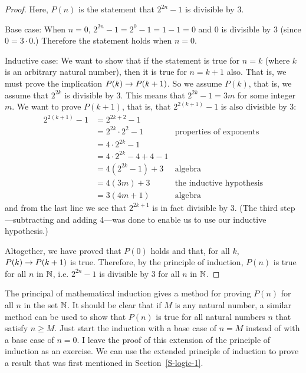 \begin{proof}
Here, $P(n)$ is the statement that $2^{2n}-1$ is divisible by 3.

Base case: When $n=0$, $2^{2n}-1 = 2^0-1=1-1=0$ and $0$ is divisible by 3 
(since $0=3\cdot 0$.)  Therefore the statement holds when $n=0$.

Inductive case: We want to show that if the statement is true for $n=k$ 
(where $k$ is an arbitrary natural number),
then it is true for $n=k+1$ also.  That is, we must prove the implication
$P(k) \rightarrow P(k+1)$.  So we assume $P(k)$, that is, we assume that $2^{2k}$ is
divisible by 3.  This means that $2^{2k} -1 = 3m$ for some integer $m$.
We want to prove $P(k+1)$, that is, that $2^{2(k+1)}-1$ is also divisible by 3:
\begin{align*}
   2^{2(k+1)}-1 &= 2^{2k+2}-1 &\\
                       &= 2^{2k}\cdot2^2 - 1 &\text{properties of exponents}\\
                       &= 4\cdot 2^{2k} -1 \\
                       &= 4\cdot 2^{2k} -4 + 4 -1 \\
                       &= 4(2^{2k} -1) + 3 &\text{algebra} \\
                       &= 4(3m) + 3 & \text{the inductive hypothesis}\\
                       &= 3(4m+1) & \text{algebra}
\end{align*}
and from the last line we see that $2^{2k+1}$ is in fact divisible by 3.  (The
third step---subtracting and adding 4---was done to enable us to use our inductive
hypothesis.)

Altogether, we have proved that $P(0)$ holds and that, for all $k$, $P(k) \rightarrow
P(k+1)$ is true.  Therefore, by the principle of induction, $P(n)$ is true for
all $n$ in ${\mathbb N}$, i.e. $2^{2n}-1$ is divisible by 3 for all $n$ in ${\mathbb N}$.
\end{proof}

The principal of mathematical induction gives a method for proving $P(n)$ for
all $n$ in the set ${\mathbb N}$.  It should be clear that if $M$ is any natural number, a similar method can
be used to show that $P(n)$ is true for all natural numbers
$n$ that satisfy $n\ge M$.  Just start the induction with a base
case of $n=M$ instead of with a base case of $n=0$.  I leave the
proof of this extension of the principle of induction as an exercise.
We can use the extended principle of induction to prove a result
that was first mentioned in Section~\ref{S-logic-1}.  

